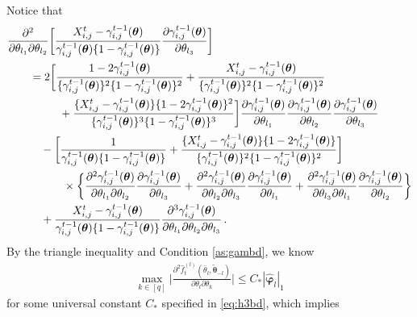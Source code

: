\documentclass[12pt]{article}
\newcommand{\btheta}{\boldsymbol \theta}
\newcommand{\bvarphi}{\boldsymbol \varphi}
\newcommand{\0}{{\bf 0}}
\begin{document}
Notice that
\begin{align*}
&\frac{\partial^2}{\partial\theta_{l_1}\partial\theta_{l_2}}\bigg[\frac{X_{i,j}^t-\gamma_{i,j}^{t-1}(\btheta)}{\gamma_{i,j}^{t-1}(\btheta)\{1-\gamma_{i,j}^{t-1}(\btheta)\}}\frac{\partial\gamma_{i,j}^{t-1}(\btheta)}{\partial\theta_{l_3}}\bigg]\\
&~~~~~~=2\bigg[\frac{1-2\gamma_{i,j}^{t-1}(\btheta)}{\{\gamma_{i,j}^{t-1}(\btheta)\}^2\{1-\gamma_{i,j}^{t-1}(\btheta)\}^2}+\frac{X_{i,j}^t-\gamma_{i,j}^{t-1}(\btheta)}{\{\gamma_{i,j}^{t-1}(\btheta)\}^2\{1-\gamma_{i,j}^{t-1}(\btheta)\}^2}\notag\\
&~~~~~~~~~~~~~~+\frac{\{X_{i,j}^t-\gamma_{i,j}^{t-1}(\btheta)\}\{1-2\gamma_{i,j}^{t-1}(\btheta)\}^2}{\{\gamma_{i,j}^{t-1}(\btheta)\}^3\{1-\gamma_{i,j}^{t-1}(\btheta)\}^3}\bigg]\frac{\partial\gamma_{i,j}^{t-1}(\btheta)}{\partial\theta_{l_1}}\frac{\partial\gamma_{i,j}^{t-1}(\btheta)}{\partial\theta_{l_2}}\frac{\partial\gamma_{i,j}^{t-1}(\btheta)}{\partial\theta_{l_3}}\notag\\
&~~~~~~~~~-\bigg[\frac{1}{\gamma_{i,j}^{t-1}(\btheta)\{1-\gamma_{i,j}^{t-1}(\btheta)\}}+\frac{\{X_{i,j}^t-\gamma_{i,j}^{t-1}(\btheta)\}\{1-2\gamma_{i,j}^{t-1}(\btheta)\}}{\{\gamma_{i,j}^{t-1}(\btheta)\}^2\{1-\gamma_{i,j}^{t-1}(\btheta)\}^2}\bigg]
\\
&~~~~~~~~~~~~~~~\times\bigg\{\frac{\partial^2\gamma_{i,j}^{t-1}(\btheta)}{\partial\theta_{l_1}\partial\theta_{l_2}}\frac{\partial\gamma_{i,j}^{t-1}(\btheta)}{\partial\theta_{l_3}}+\frac{\partial^2\gamma_{i,j}^{t-1}(\btheta)}{\partial\theta_{l_2}\partial\theta_{l_3}}\frac{\partial\gamma_{i,j}^{t-1}(\btheta)}{\partial\theta_{l_1}}+\frac{\partial^2\gamma_{i,j}^{t-1}(\btheta)}{\partial\theta_{l_3}\partial\theta_{l_1}}\frac{\partial\gamma_{i,j}^{t-1}(\btheta)}{\partial\theta_{l_2}}\bigg\}\notag\\
&~~~~~~~~~+\frac{X_{i,j}^t-\gamma_{i,j}^{t-1}(\btheta)}{\gamma_{i,j}^{t-1}(\btheta)\{1-\gamma_{i,j}^{t-1}(\btheta)\}}\frac{\partial^3\gamma_{i,j}^{t-1}(\btheta)}{\partial\theta_{l_1}\partial\theta_{l_2}\partial\theta_{l_3}}\,.
\end{align*}
By the triangle inequality and Condition \ref{as:gambd},  we know 
\begin{align}\label{eq:asybd2}
\max_{k\in[q]}\bigg|\frac{\partial^2\hat{f}_t^{(l)}(\bar{\theta}_l,\tilde{\btheta}_{-l})}{\partial\theta_l\partial\theta_k}\bigg|\leq C_*|\hat{\bvarphi}_l|_1
\end{align}
for some universal constant $C_*$ specified in \eqref{eq:h3bd}, which implies
\end{document}
